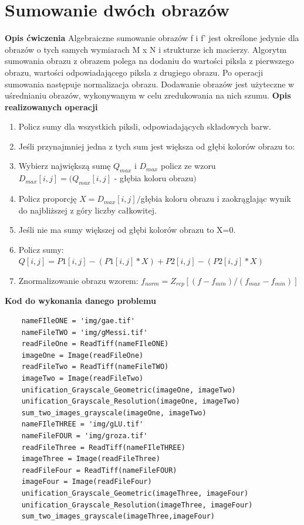 \documentclass[magisterska,openany]{pracadypl}
\begin{document}
\newpage
\section{Sumowanie dwóch obrazów}

\vspace{0.5cm}\textbf{\Large Opis ćwiczenia}
\vspace{0.25cm}\newline
Algebraiczne sumowanie obrazów f i f’ jest określone jedynie dla obrazów o tych samych wymiarach M x N i strukturze ich macierzy. Algorytm sumowania obrazu z obrazem polega na dodaniu do wartości piksla z pierwszego obrazu, wartości odpowiadającego piksla z drugiego obrazu. Po operacji sumowania następuje normalizacja obrazu. Dodawanie obrazów jest użyteczne w uśrednianiu obrazów, wykonywanym w celu zredukowania na nich szumu.
\newline
\newline
\textbf{\Large Opis realizowanych operacji}
\begin{enumerate}
\item Policz sumy dla wszystkich piksli, odpowiadających składowych barw.
\item Jeśli przynajmniej jedna z tych sum jest większa od głębi kolorów obrazu to:
\item Wybierz największą sumę $Q_{max}$ i $D_{max}$ policz ze wzoru
\newline $D_{max}[i,j]=(Q_{max}[i,j]$ - głębia koloru obrazu$)$
\item Policz proporcję $X=D_{max}[i,j]/$głębia koloru obrazu 
\newline i zaokrąglając wynik do najbliższej z góry liczby całkowitej.
\item Jeśli nie ma sumy większej od głębi kolorów obrazu to X=0.
\item Policz sumy: 
\newline $Q[i,j]=P1[i,j]-(P1[i,j]*X)+P2[i,j]-(P2[i,j]*X)$
\item Znormalizowanie obrazu wzorem:
\newline $f_{norm}=Z_{rep}[(f-f_{min})/(f_{max}-f_{min})]$
\end{enumerate}

\vspace{0.5cm}
\textbf{\Large Kod do wykonania danego problemu}
\lstset{language=Python}
\vspace{0.25cm}
\begin{lstlisting}
	nameFIleONE = 'img/gae.tif'
	nameFileTWO = 'img/gMessi.tif'
	readFileOne = ReadTiff(nameFIleONE)
	imageOne = Image(readFileOne)
	readFileTwo = ReadTiff(nameFileTWO)
	imageTwo = Image(readFileTwo)
	unification_Grayscale_Geometric(imageOne, imageTwo)
	unification_Grayscale_Resolution(imageOne, imageTwo) 
	sum_two_images_grayscale(imageOne, imageTwo)
	nameFIleTHREE = 'img/gLU.tif'
	nameFileFOUR = 'img/groza.tif'
	readFileThree = ReadTiff(nameFIleTHREE)
	imageThree = Image(readFileThree)
	readFileFour = ReadTiff(nameFileFOUR)
	imageFour = Image(readFileFour)
	unification_Grayscale_Geometric(imageThree, imageFour)
	unification_Grayscale_Resolution(imageThree, imageFour)
	sum_two_images_grayscale(imageThree,imageFour)

\end{lstlisting}
\end{document}
